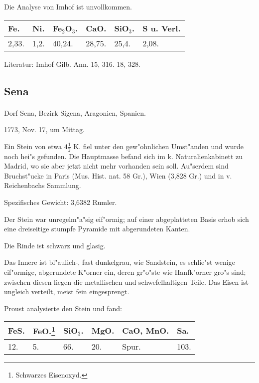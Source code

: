 \documentclass[a4paper, 11pt, oneside]{article}
\begin{document}
Die Analyse von Imhof ist unvollkommen.
\begin{table}[!ht]
    \centering
    \begin{tabular}{l l l l l l}
        Fe. & Ni. & Fe$_{2}$O$_{3}$. & CaO. & SiO$_{3}$. & S u. Verl.\\\hline
        2,33. & 1,2. & 40,24. & 28,75. & 25,4. & 2,08. \\
    \end{tabular}
\end{table}

\footnotesize
Literatur: Imhof Gilb. Ann. 15, 316. 18, 328.
\subsection{Sena}
\normalsize
\paragraph{}
Dorf Sena, Bezirk Sigena, Aragonien, Spanien.

1773, Nov. 17, um Mittag.

Ein Stein von etwa $4\frac{1}{2}$ K. fiel unter den gew"ohnlichen Umst"anden und wurde noch hei"s gefunden. Die Hauptmasse befand sich im k. Naturalienkabinett zu Madrid, wo sie aber jetzt nicht mehr vorhanden sein soll. Au"serdem sind Bruchst"ucke in Paris (Mus. Hist. nat. 58 Gr.), Wien (3,828 Gr.) und in v. Reichenbachs Sammlung.

Spezifisches Gewicht: 3,6382 Rumler.

Der Stein war unregelm"a"sig eif"ormig; auf einer abgeplatteten Basis erhob sich eine dreiseitige stumpfe Pyramide mit abgerundeten Kanten.

Die Rinde ist schwarz und glasig.

Das Innere ist bl"aulich-, fast dunkelgrau, wie Sandstein, es schlie"st wenige eif"ormige, abgerundete K"orner ein, deren gr"o"ste wie Hanfk"orner gro"s sind; zwischen diesen liegen die metallischen und schwefelhaltigen Teile. Das Eisen ist ungleich verteilt, meist fein eingesprengt.

Proust analysierte den Stein und fand:

\begin{table}[!ht]
    \centering
    \begin{tabular}{l l l l l l}
        FeS. & FeO.\footnote{Schwarzes Eisenoxyd.} & SiO$_{3}$. & MgO. & CaO, MnO. & Sa. \\ \hline
        12. & 5. & 66. & 20. & Spur. & 103. \\
    \end{tabular}
\end{table}
\end{document}
